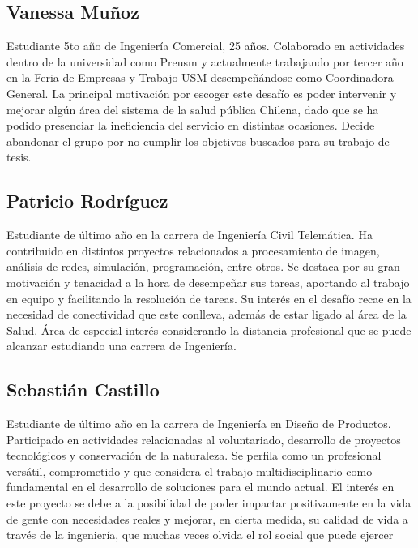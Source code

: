 \subsection{Vanessa Muñoz}
Estudiante 5to año de Ingeniería Comercial, 25 años. Colaborado en actividades dentro de la universidad como Preusm y actualmente trabajando por tercer año en la Feria de Empresas y Trabajo USM desempeñándose como Coordinadora General. La principal motivación por escoger este desafío es poder intervenir y mejorar algún área del sistema de la salud pública Chilena, dado que se ha podido presenciar la ineficiencia del servicio en distintas ocasiones. 
Decide abandonar el grupo por no cumplir los objetivos buscados para su trabajo de tesis.

\newpage
\subsection{Patricio Rodríguez}
Estudiante de último año en la carrera de Ingeniería Civil Telemática. Ha contribuido en distintos proyectos relacionados a procesamiento de imagen, análisis de redes, simulación, programación, entre otros. Se destaca por su gran motivación y tenacidad a la hora de desempeñar sus tareas, aportando al trabajo en equipo y facilitando la resolución de tareas. Su interés en el desafío recae en la necesidad de conectividad que este conlleva, además de estar ligado al área de la Salud. Área de especial interés considerando la distancia profesional que se puede alcanzar estudiando una carrera de Ingeniería.

\subsection{Sebastián Castillo}
Estudiante de último año en la carrera de Ingeniería en Diseño de Productos. Participado en actividades relacionadas al voluntariado, desarrollo de proyectos tecnológicos y conservación de la naturaleza. Se perfila como un profesional versátil, comprometido y que considera el trabajo multidisciplinario como fundamental en el desarrollo de soluciones para el mundo actual. El interés en este proyecto se debe a la posibilidad de poder impactar positivamente en la vida de gente con necesidades reales y mejorar, en cierta medida, su calidad de vida a través de la ingeniería, que muchas veces olvida el rol social que puede ejercer

\newpage
